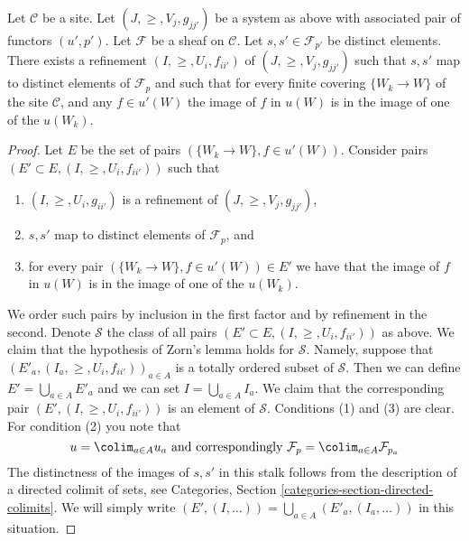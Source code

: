 \begin{lemma}
\label{lemma-refine-all-at-once}
Let $\mathcal{C}$ be a site.
Let $(J, \geq, V_j, g_{jj'})$ be a system as above with associated
pair of functors $(u', p')$.
Let $\mathcal{F}$ be a sheaf on $\mathcal{C}$.
Let $s, s' \in \mathcal{F}_{p'}$ be distinct elements.
There exists a refinement $(I, \geq, U_i, f_{ii'})$
of $(J, \geq, V_j, g_{jj'})$ such that $s, s'$ map
to distinct elements of $\mathcal{F}_p$ and such that
for every finite covering $\{W_k \to W\}$ of the site
$\mathcal{C}$, and any $f \in u'(W)$ the image of $f$ in $u(W)$
is in the image of one of the $u(W_k)$.
\end{lemma}

\begin{proof}
Let $E$ be the set of pairs $(\{W_k \to W\}, f\in u'(W))$.
Consider pairs $(E' \subset E, (I, \geq, U_i, f_{ii'}))$
such that
\begin{enumerate}
\item $(I, \geq, U_i, g_{ii'})$ is a refinement of $(J, \geq, V_j, g_{jj'})$,
\item $s, s'$ map to distinct elements of $\mathcal{F}_p$, and
\item for every pair $(\{W_k \to W\}, f\in u'(W)) \in E'$ we have that
the image of $f$ in $u(W)$ is in the image of one of the $u(W_k)$.
\end{enumerate}
We order such pairs by inclusion in the first factor and
by refinement in the second. Denote $\mathcal{S}$ the class
of all pairs $(E' \subset E, (I, \geq, U_i, f_{ii'}))$ as above.
We claim that the hypothesis of Zorn's lemma holds for $\mathcal{S}$. Namely,
suppose that $(E'_a, (I_a, \geq, U_i, f_{ii'}))_{a \in A}$
is a totally ordered subset of $\mathcal{S}$. Then we can define
$E' = \bigcup_{a \in A} E'_a$ and we can set $I = \bigcup_{a \in A} I_a$.
We claim that the corresponding pair
$(E' , (I, \geq, U_i, f_{ii'}))$ is an element of $\mathcal{S}$.
Conditions (1) and (3) are clear. For condition (2) you note
that
$$
u = \colim_{a \in A} u_a
\text{ and correspondingly }
\mathcal{F}_p = \colim_{a \in A} \mathcal{F}_{p_a}
$$
The distinctness of the images of $s, s'$ in this stalk follows
from the description of a directed colimit of sets, see
Categories, Section \ref{categories-section-directed-colimits}.
We will simply write
$(E', (I, \ldots)) = \bigcup_{a \in A}(E'_a, (I_a, \ldots))$
in this situation.


\end{proof}
